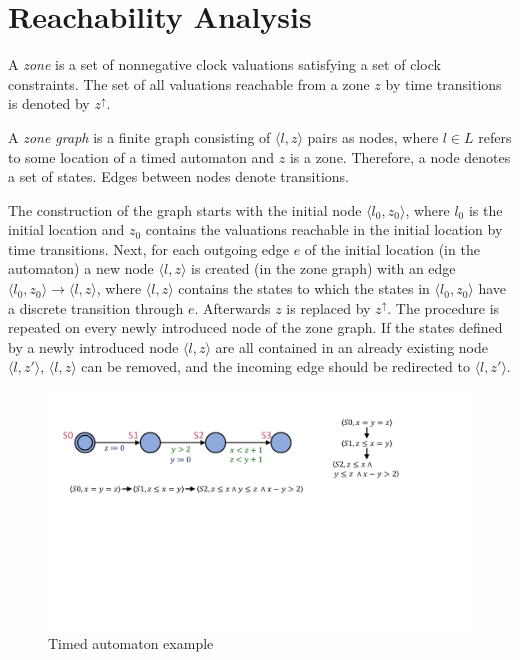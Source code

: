 \section{Reachability Analysis} \label{sec:reach}  

A \emph{zone} is a set of nonnegative clock valuations satisfying a set of clock constraints.
The set of all valuations reachable from a zone $z$ by time transitions is denoted by $z^\uparrow$.

A \emph{zone graph} is a finite graph consisting of $\langle l,z \rangle$ pairs as nodes, where $l \in L$ refers to some
location of a timed automaton and $z$ is a zone. Therefore, a node denotes a set
of states. Edges between nodes denote transitions. 

The construction of the graph starts with the initial node  $\langle l_0,z_0 \rangle$,
where $l_0$ is the initial location and $z_0$ contains the valuations reachable in the initial location by time transitions. 
Next, for each outgoing edge $e$ of the initial location (in the automaton) a new node  $\langle l,z \rangle$ is created (in the zone graph) with an edge
$\langle l_0,z_0 \rangle \to \langle l,z \rangle$, where $\langle l,z \rangle$ contains the states to which the states in $\langle l_0,z_0 \rangle$ have a discrete transition through $e$. Afterwards $z$ is replaced by $z^\uparrow$.  The procedure is repeated on every newly introduced node of the zone graph. If the states defined by a newly introduced node $\langle l,z \rangle$ are all contained in an already existing node $\langle l,z' \rangle$, $\langle l,z \rangle$ can be removed, and the incoming edge should be redirected to $\langle l,z' \rangle$.

\begin{figure} [h]
	\centering
	\includegraphics[width=.7\textwidth]{include/figures/splitexample_aut}
	\caption{Timed automaton example}
	\label{fig:splitex}
\end{figure}  


